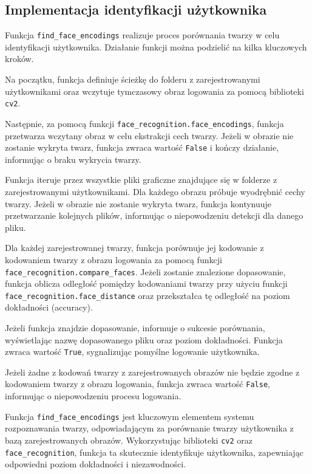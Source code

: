 \documentclass{report}
\begin{document}
\subsection{\Large Implementacja identyfikacji użytkownika}

Funkcja \texttt{find\_face\_encodings} realizuje proces porównania twarzy w celu identyfikacji użytkownika. Działanie funkcji można podzielić na kilka kluczowych kroków.

Na początku, funkcja definiuje ścieżkę do folderu z zarejestrowanymi użytkownikami oraz wczytuje tymczasowy obraz logowania za pomocą biblioteki \texttt{cv2}. 

Następnie, za pomocą funkcji \texttt{face\_recognition.face\_encodings}, funkcja przetwarza wczytany obraz w celu ekstrakcji cech twarzy. Jeżeli w obrazie nie zostanie wykryta twarz, funkcja zwraca wartość \texttt{False} i kończy działanie, informując o braku wykrycia twarzy.

Funkcja iteruje przez wszystkie pliki graficzne znajdujące się w folderze z zarejestrowanymi użytkownikami. Dla każdego obrazu próbuje wyodrębnić cechy twarzy. Jeżeli w obrazie nie zostanie wykryta twarz, funkcja kontynuuje przetwarzanie kolejnych plików, informując o niepowodzeniu detekcji dla danego pliku.

Dla każdej zarejestrowanej twarzy, funkcja porównuje jej kodowanie z kodowaniem twarzy z obrazu logowania za pomocą funkcji \texttt{face\_recognition.compare\_faces}. Jeżeli zostanie znalezione dopasowanie, funkcja oblicza odległość pomiędzy kodowaniami twarzy przy użyciu funkcji \newline \texttt{face\_recognition.face\_distance} oraz przekształca tę odległość na poziom dokładności (accuracy).

Jeżeli funkcja znajdzie dopasowanie, informuje o sukcesie porównania, wyświetlając nazwę dopasowanego pliku oraz poziom dokładności. Funkcja zwraca wartość \texttt{True}, sygnalizując pomyślne logowanie użytkownika. 

Jeżeli żadne z kodowań twarzy z zarejestrowanych obrazów nie będzie zgodne z kodowaniem twarzy z obrazu logowania, funkcja zwraca wartość \texttt{False}, informując o niepowodzeniu procesu logowania.

Funkcja \texttt{find\_face\_encodings} jest kluczowym elementem systemu rozpoznawania twarzy, odpowiadającym za porównanie twarzy użytkownika z bazą zarejestrowanych obrazów. Wykorzystując biblioteki \texttt{cv2} oraz \texttt{face\_recognition}, funkcja ta skutecznie identyfikuje użytkownika, zapewniając odpowiedni poziom dokładności i niezawodności.
\end{document}
